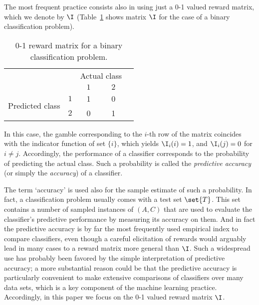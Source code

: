 \documentclass[a4paper,10pt,reqno]{amsart}
\theoremstyle{remark}
\begin{document}
The most frequent practice consists also in using just a 0-1 valued reward matrix, which we denote by $\I$ (Table~\ref{tab:binary-rm} shows matrix $\I$ for the case of a binary classification problem).
\begin{table}[htp]
  \centering
\begin{tabular}{cc|ccc}
& & \multicolumn{2}{c}{Actual class} \\ %
& & $1$ & $2$ \\ \cline{1-4}
\multicolumn{1}{c}{\multirow{2}{*}{Predicted class}} &
\multicolumn{1}{c|}{$1$} & 1 & 0     \\ %
\multicolumn{1}{c}{} &
\multicolumn{1}{c|}{$2$} & 0 & 1\\ %
\end{tabular}
  \caption{0-1 reward matrix for a binary classification problem.}
  \label{tab:binary-rm}
\end{table}
In this case, the gamble corresponding to the $i$-th row of the matrix coincides with the indicator function of set $\{i\}$, which yields $\I_i(i)=1$, and $\I_i(j)=0$ for $i\neq j$. Accordingly, the performance of a classifier corresponds to the probability of predicting the actual class. Such a probability is called the \emph{predictive accuracy} (or simply the \emph{accuracy}) of a classifier. 

The term `accuracy' is used also for the sample estimate of such a probability. In fact, a classification problem usually comes with a test set $\set{T}$. This set contains a number of sampled instances of $(A,C)$ that are used to evaluate the classifier's predictive performance by measuring its accuracy on them. And in fact the predictive accuracy is by far the most frequently used empirical index to compare classifiers, even though a careful elicitation of rewards would arguably lead in many cases to a reward matrix more general than $\I$. Such a widespread use has probably been favored by the simple interpretation of predictive accuracy; a more substantial reason could be that the predictive accuracy is particularly convenient to make extensive comparisons of classifiers over many data sets, which is a key component of the machine learning practice. Accordingly, in this paper we focus on the 0-1 valued reward matrix $\I$.
\end{document}
